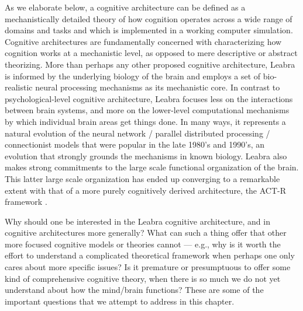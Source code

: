 \documentclass[11pt,twoside]{article}
\begin{document}
As we elaborate below, a cognitive architecture can be defined as a
mechanistically detailed theory of how cognition operates across a wide range
of domains and tasks and which is implemented in a working computer
simulation.  Cognitive architectures are fundamentally concerned with
characterizing how cognition works at a mechanistic level, as opposed to mere
descriptive or abstract theorizing.  More than perhaps any other proposed
cognitive architecture, Leabra is informed by the underlying biology of the
brain and employs a set of bio-realistic neural processing mechanisms as its
mechanistic core.  In contrast to psychological-level cognitive architecture,
Leabra focuses less on the interactions between brain systems, and more on the
lower-level computational mechanisms by which individual brain areas get
things done.  In many ways, it represents a natural evolution of the neural
network / parallel distributed processing / connectionist models that were
popular in the late 1980's and 1990's, an evolution that strongly grounds the
mechanisms in known biology.  
Leabra also makes strong commitments to the
large scale functional organization of the brain. This latter large scale
organization has ended up converging to a remarkable extent with that of a
more purely cognitively derived architecture, the ACT-R framework
\cite{AndersonBothellByrneEtAl04}.

Why should one be interested in the Leabra cognitive architecture, and in
cognitive architectures more generally?  What can such a thing offer that
other more focused cognitive models or theories cannot --- e.g., why is it
worth the effort to understand a complicated theoretical framework when
perhaps one only cares about more specific issues?  Is it premature or
presumptuous to offer some kind of comprehensive cognitive theory, when there
is so much we do not yet understand about how the mind/brain
functions?  These are some of the important questions that we attempt to
address in this chapter.
\end{document}
